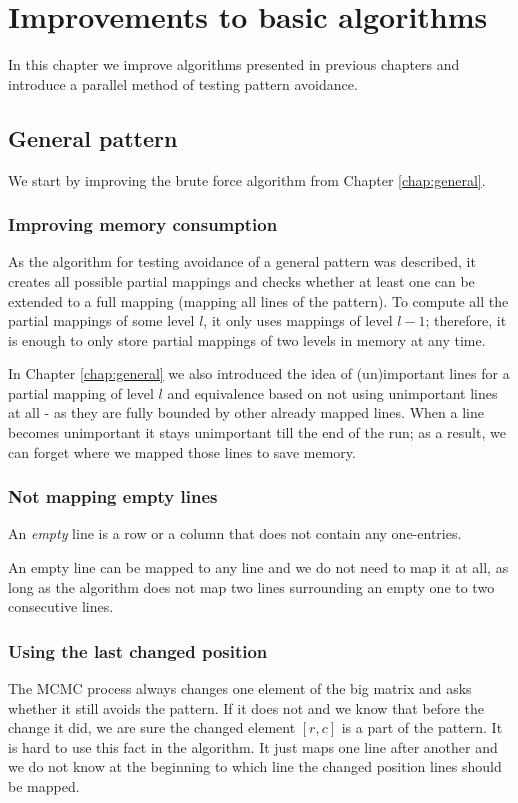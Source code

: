 \chapter{Improvements to basic algorithms}
\label{chap:imp}
In this chapter we improve algorithms presented in previous chapters and introduce a parallel method of testing pattern avoidance.

\section{General pattern}
We start by improving the brute force algorithm from Chapter \ref{chap:general}.

\subsection{Improving memory consumption}
As the algorithm for testing avoidance of a general pattern was described, it creates all possible partial mappings and checks whether at least one can be extended to a full mapping (mapping all lines of the pattern). To compute all the partial mappings of some level $l$, it only uses mappings of level $l-1$; therefore, it is enough to only store partial mappings of two levels in memory at any time.

In Chapter \ref{chap:general} we also introduced the idea of (un)important lines for a partial mapping of level $l$ and equivalence based on not using unimportant lines at all - as they are fully bounded by other already mapped lines. When a line becomes unimportant it stays unimportant till the end of the run; as a result, we can forget where we mapped those lines to save memory.

\subsection{Not mapping empty lines}
\begin{defn}
An \emph{empty} line is a row or a column that does not contain any one-entries.
\end{defn}
An empty line can be mapped to any line and we do not need to map it at all, as long as the algorithm does not map two lines surrounding an empty one to two consecutive lines.

\subsection{Using the last changed position}
The MCMC process always changes one element of the big matrix and asks whether it still avoids the pattern. If it does not and we know that before the change it did, we are sure the changed element $[r,c]$ is a part of the pattern. It is hard to use this fact in the algorithm. It just maps one line after another and we do not know at the beginning to which line the changed position lines should be mapped.

